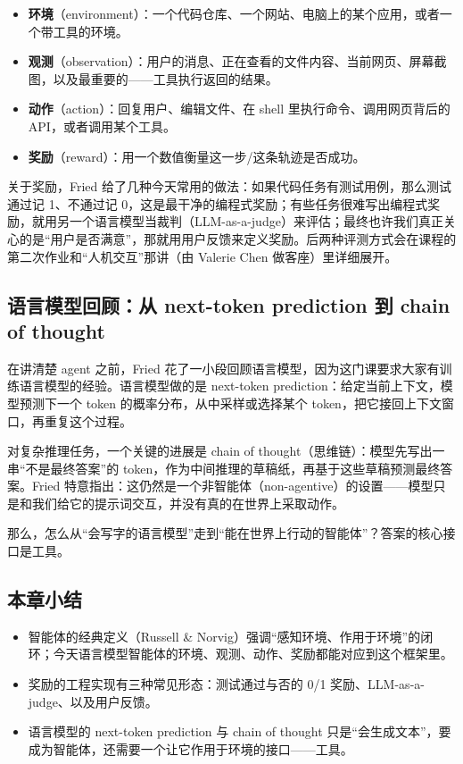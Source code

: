 \documentclass[a4paper]{article}
\begin{document}
\begin{itemize}
\item \textbf{环境}（environment）：一个代码仓库、一个网站、电脑上的某个应用，或者一个带工具的环境。
\item \textbf{观测}（observation）：用户的消​息、正在查看的文件内容、当前网页、屏幕截图，以及最重要的——工具执行返回的结果。
\item \textbf{动作}（action）：回复用户、编辑文件、在 shell 里执行命令、调用网页背后的 API，或者调用某个工具。
\item \textbf{奖励}（reward）：用一个数值衡量这一步/这条轨迹是否成功。
\end{itemize}

关于奖励，Fried 给了几种今天常用的做法：如果代码任务有测试用例，那么测试通过记 1、不通过记 0，这是最干净的编程式奖励；有些任务很难写出编程式奖励，就用另一个语言模型当裁判（LLM-as-a-judge）来评估；最终也许我们真正关心的是“用户是否满意”，那就用用户反馈来定义奖励。后两种评测方式会在课程的第二次作业和“人机交互”那讲（由 Valerie Chen 做客座）里详细展开。

\subsection{语言模型回顾：从 next-token prediction 到 chain of thought}

在讲清楚 agent 之前，Fried 花了一小段回顾语言模型，因为这门课要求大家有训练语言模型的经验。语言模型做的是 next-token prediction：给定当前上下文，模型预测下一个 token 的概率分布，从中采样或选择某个 token，把它接回上下文窗口，再重复这个过程。

对复杂推理任务，一个关键的进展是 chain of thought（思维链）：模型先写出一串“不是最终答案”的 token，作为中间推理的草稿纸，再基于这些草稿预测最终答案。Fried 特意指出：这仍然是一个非智能体（non-agentive）的设置——模型只是和我们给它的提示词交互，并没有真的在世界上采取动作。

那么，怎么从“会写字的语言模型”走到“能在世界上行动的智能体”？答案的核心接口是工具。

\subsection{本章小结}

\begin{itemize}
\item 智能体的经典定义（Russell \& Norvig）强调“感知环境、作用于环境”的闭环；今天语言模型智能体的环境、观测、动作、奖励都能对应到这个框架里。
\item 奖励的工程实现有三种常见形态：测试通过与否的 0/1 奖励、LLM-as-a-judge、以及用户反馈。
\item 语言模型的 next-token prediction 与 chain of thought 只是“会生成文本”，要成为智能体，还需要一个让它作用于环境的接口——工具。
\end{itemize}
\end{document}
